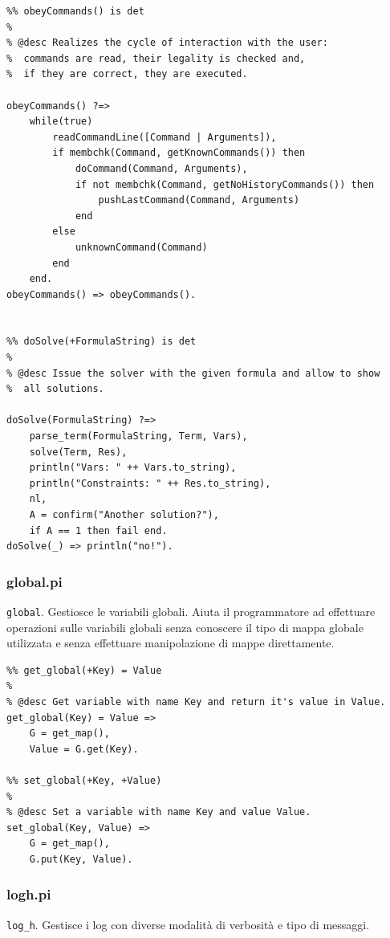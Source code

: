 \documentclass[12pt,a4paper,openright]{book} %
\begin{document}
\begin{verbatim}
%% obeyCommands() is det
% 
% @desc Realizes the cycle of interaction with the user:
%  commands are read, their legality is checked and,
%  if they are correct, they are executed.

obeyCommands() ?=>
    while(true)
        readCommandLine([Command | Arguments]),
        if membchk(Command, getKnownCommands()) then
            doCommand(Command, Arguments),
            if not membchk(Command, getNoHistoryCommands()) then
                pushLastCommand(Command, Arguments)    
            end
        else 
            unknownCommand(Command)
        end
    end.
obeyCommands() => obeyCommands().


%% doSolve(+FormulaString) is det
%
% @desc Issue the solver with the given formula and allow to show
%  all solutions.

doSolve(FormulaString) ?=>
    parse_term(FormulaString, Term, Vars),
    solve(Term, Res),
    println("Vars: " ++ Vars.to_string),
    println("Constraints: " ++ Res.to_string),
    nl,
    A = confirm("Another solution?"),
    if A == 1 then fail end.
doSolve(_) => println("no!").
\end{verbatim}

\subsubsection{global.pi}

\verb|global|. Gestiosce le variabili globali. Aiuta il programmatore ad effettuare operazioni sulle variabili globali senza conoscere il tipo di mappa globale utilizzata e senza effettuare manipolazione di mappe direttamente.

\begin{verbatim}
%% get_global(+Key) = Value
%
% @desc Get variable with name Key and return it's value in Value.
get_global(Key) = Value =>
    G = get_map(),
    Value = G.get(Key).

%% set_global(+Key, +Value)
%
% @desc Set a variable with name Key and value Value.
set_global(Key, Value) =>
    G = get_map(),
    G.put(Key, Value).
\end{verbatim}

\subsubsection{log\textunderscore h.pi}

\verb|log_h|. Gestisce i log con diverse modalità di verbosità e tipo di messaggi.
\end{document}
